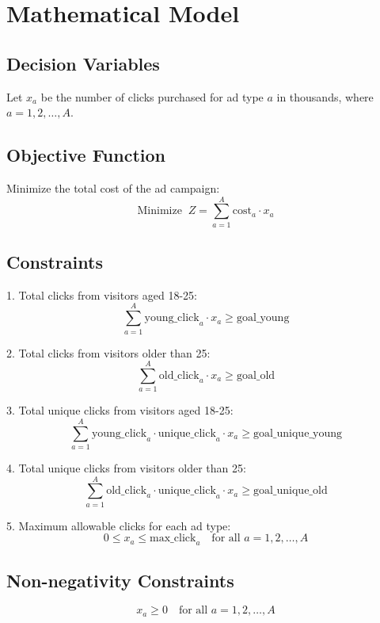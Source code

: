 \documentclass{article}
\begin{document}
\section*{Mathematical Model}

\subsection*{Decision Variables}
Let \( x_a \) be the number of clicks purchased for ad type \( a \) in thousands, where \( a = 1, 2, \ldots, A \).

\subsection*{Objective Function}
Minimize the total cost of the ad campaign:
\[
\text{Minimize }\ Z = \sum_{a=1}^{A} \text{cost}_a \cdot x_a
\]

\subsection*{Constraints}
1. Total clicks from visitors aged 18-25:
\[
\sum_{a=1}^{A} \text{young\_click}_{a} \cdot x_a \geq \text{goal\_young}
\]

2. Total clicks from visitors older than 25:
\[
\sum_{a=1}^{A} \text{old\_click}_{a} \cdot x_a \geq \text{goal\_old}
\]

3. Total unique clicks from visitors aged 18-25:
\[
\sum_{a=1}^{A} \text{young\_click}_{a} \cdot \text{unique\_click}_{a} \cdot x_a \geq \text{goal\_unique\_young}
\]

4. Total unique clicks from visitors older than 25:
\[
\sum_{a=1}^{A} \text{old\_click}_{a} \cdot \text{unique\_click}_{a} \cdot x_a \geq \text{goal\_unique\_old}
\]

5. Maximum allowable clicks for each ad type:
\[
0 \leq x_a \leq \text{max\_click}_{a} \quad \text{for all } a = 1, 2, \ldots, A
\]

\subsection*{Non-negativity Constraints}
\[
x_a \geq 0 \quad \text{for all } a = 1, 2, \ldots, A
\]
\end{document}
